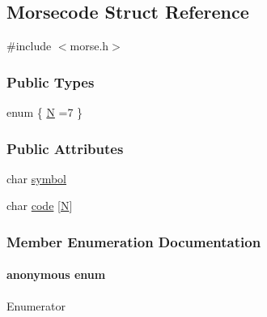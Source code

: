 \hypertarget{structMorsecode}{\subsection{Morsecode Struct Reference}
\label{structMorsecode}
}


{\ttfamily \#include $<$morse.\+h$>$}

\subsubsection*{Public Types}
\begin{DoxyCompactItemize}
\item 
enum \{ \hyperlink{structMorsecode_ad8b781b4f5aa87b0afdef835324bcf24a352dad4a744b50bf7d7db44a4959260f}{N} =7
 \}
\end{DoxyCompactItemize}
\subsubsection*{Public Attributes}
\begin{DoxyCompactItemize}
\item 
char \hyperlink{structMorsecode_a8f7fb86f9de77dc705dc37730e83869b}{symbol}
\item 
char \hyperlink{structMorsecode_abb81632acf39b9e91f76bd09b12fc0e0}{code} \mbox{[}\hyperlink{structMorsecode_ad8b781b4f5aa87b0afdef835324bcf24a352dad4a744b50bf7d7db44a4959260f}{N}\mbox{]}
\end{DoxyCompactItemize}


\subsubsection{Member Enumeration Documentation}
\hypertarget{structMorsecode_ad8b781b4f5aa87b0afdef835324bcf24}{\paragraph[{anonymous enum}]{\setlength{\rightskip}{0pt plus 5cm}anonymous enum}}\label{structMorsecode_ad8b781b4f5aa87b0afdef835324bcf24}
\begin{Desc}
\item[Enumerator]\par
\begin{description}
\item[{\em 
\hypertarget{structMorsecode_ad8b781b4f5aa87b0afdef835324bcf24a352dad4a744b50bf7d7db44a4959260f}{N}\label{structMorsecode_ad8b781b4f5aa87b0afdef835324bcf24a352dad4a744b50bf7d7db44a4959260f}
}]\end{description}
\end{Desc}

